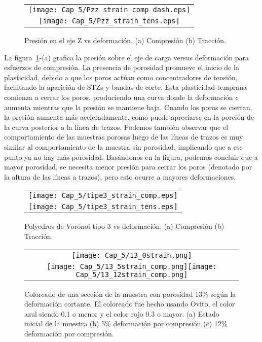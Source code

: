 \begin{figure}[h!]
  \centering
  \begin{tabular} {c}
    \texttt{[image: Cap\_5/Pzz\_strain\_comp\_dash.eps]}\\
    \texttt{[image: Cap\_5/Pzz\_strain\_tens.eps]}\\
  \end{tabular}
  \caption{Presión en el eje Z vs deformación. (a) Compresión (b) Tracción.}
  \label{C5:fg:pzz2}
\end{figure}

La figura~\ref{C5:fg:pzz2}-(a) grafica la presión sobre el eje de carga versus deformación para esfuerzos de compresión.
La presencia de porosidad promueve el inicio de la plasticidad, debido a que los poros actúan como concentradores de tensión,
facilitando la aparición de STZs y bandas de corte. Esta plasticidad temprana comienza a
cerrar los poros, produciendo una curva donde la deformación $\epsilon$ aumenta mientras que la presión se mantiene baja.
Cuando los poros se cierran, la presión aumenta más aceleradamente, como puede apreciarse en la porción de la curva posterior
a la línea de trazos. Podemos también observar que el comportamiento de las muestras porosas luego de las líneas de trazos es
muy similar al comportamiento de la muestra sin porosidad, implicando que a ese punto ya no hay más porosidad. Basándonos en la figura,
podemos concluir que a mayor porosidad, se necesita menor presión para cerrar los poros (denotado por la altura de las líneas a trazos),
pero esto ocurre a mayores deformaciones.

\begin{figure}[h!]
  \centering
  \begin{tabular} {c}
    \texttt{[image: Cap\_5/tipe3\_strain\_comp.eps]}\\
    \texttt{[image: Cap\_5/tipe3\_strain\_tens.eps]}\\
  \end{tabular}
  \caption{Polyedros de Voronoi tipo 3 vs deformación. (a) Compresión (b) Tracción.}
  \label{C5:fg:tip3}
\end{figure}

\begin{figure}[h!]
  \centering
  \begin{tabular}{c}
    \texttt{[image: Cap\_5/13\_0strain.png]} \\
    \texttt{[image: Cap\_5/13\_5strain\_comp.png]}\texttt{[image: Cap\_5/13\_12strain\_comp.png]} \\
  \end{tabular}
  \caption{Coloreado de una sección de la muestra con porosidad 13\% según la deformación cortante. El coloreado fue hecho 
  usando Ovito, el color azul siendo 0.1 o menor y el color rojo 0.3 o mayor. (a) Estado inicial de la muestra (b) 5\% deformación por compresión
  (c) 12\% deformación por compresión.}
  \label{C5:fg:ss_comp}
\end{figure}

